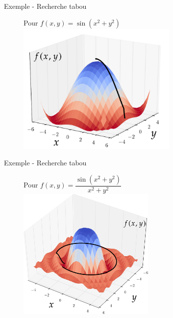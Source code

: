 \documentclass{beamer}
\begin{document}
\begin{frame}{Exemple - Recherche tabou}


  \begin{figure}[tb]
    \centering
    Pour $f(x,y) = \sin(x^2+y^2)$
    \includegraphics[width=0.7\textwidth]{figures/3dtabufunc.pdf}
  \end{figure}
\end{frame}


\begin{frame}{Exemple - Recherche tabou}


  \begin{figure}[tb]
    \centering
    Pour $f(x,y) = \dfrac{\sin(x^2+y^2)}{x^2+y^2}$
    \includegraphics[width=0.6\textwidth]{figures/3dtabufunc2.pdf}
  \end{figure}
\end{frame}
\end{document}
